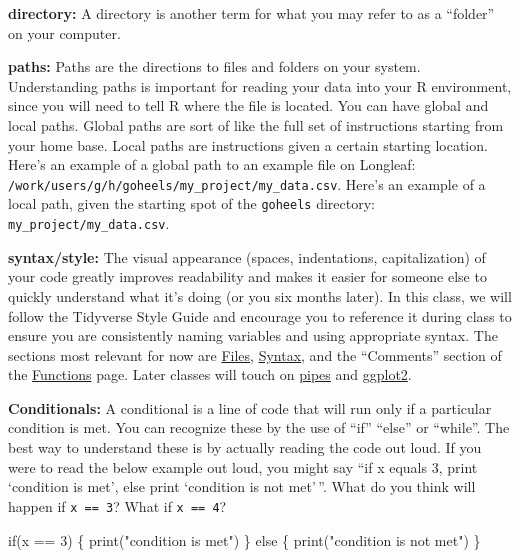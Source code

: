 \documentclass[
  letterpaper,
  DIV=11,
  numbers=noendperiod]{scrreprt}
\newenvironment{Shaded}{\begin{snugshade}}{\end{snugshade}}
\newcommand{\ControlFlowTok}[1]{\textcolor[rgb]{0.00,0.23,0.31}{#1}}
\newcommand{\DecValTok}[1]{\textcolor[rgb]{0.68,0.00,0.00}{#1}}
\newcommand{\FunctionTok}[1]{\textcolor[rgb]{0.28,0.35,0.67}{#1}}
\newcommand{\NormalTok}[1]{\textcolor[rgb]{0.00,0.23,0.31}{#1}}
\newcommand{\SpecialCharTok}[1]{\textcolor[rgb]{0.37,0.37,0.37}{#1}}
\newcommand{\StringTok}[1]{\textcolor[rgb]{0.13,0.47,0.30}{#1}}
\begin{document}
\textbf{directory:} A directory is another term for what you may refer
to as a ``folder'' on your computer.

\textbf{paths:} Paths are the directions to files and folders on your
system. Understanding paths is important for reading your data into your
R environment, since you will need to tell R where the file is located.
You can have global and local paths. Global paths are sort of like the
full set of instructions starting from your home base. Local paths are
instructions given a certain starting location. Here's an example of a
global path to an example file on Longleaf:
\texttt{/work/users/g/h/goheels/my\_project/my\_data.csv}. Here's an
example of a local path, given the starting spot of the \texttt{goheels}
directory: \texttt{my\_project/my\_data.csv}.

\textbf{syntax/style:} The visual appearance (spaces, indentations,
capitalization) of your code greatly improves readability and makes it
easier for someone else to quickly understand what it's doing (or you
six months later). In this class, we will follow the Tidyverse Style
Guide and encourage you to reference it during class to ensure you are
consistently naming variables and using appropriate syntax. The sections
most relevant for now are
\href{https://style.tidyverse.org/files.html}{Files},
\href{https://style.tidyverse.org/files.html}{Syntax}, and the
``Comments'' section of the
\href{https://style.tidyverse.org/functions.html\#comments-1}{Functions}
page. Later classes will touch on
\href{https://style.tidyverse.org/pipes.html}{pipes} and
\href{https://style.tidyverse.org/ggplot2.html}{ggplot2}.

\textbf{Conditionals:} A conditional is a line of code that will run
only if a particular condition is met. You can recognize these by the
use of ``if'' ``else'' or ``while''. The best way to understand these is
by actually reading the code out loud. If you were to read the below
example out loud, you might say ``if x equals 3, print `condition is
met', else print `condition is not met'\,''. What do you think will
happen if \texttt{x\ ==\ 3}? What if \texttt{x\ ==\ 4}?

\begin{Shaded}
\begin{Highlighting}[]
\ControlFlowTok{if}\NormalTok{(x }\SpecialCharTok{==} \DecValTok{3}\NormalTok{) \{}
  \FunctionTok{print}\NormalTok{(}\StringTok{"condition is met"}\NormalTok{)}
\NormalTok{\} }\ControlFlowTok{else}\NormalTok{ \{}
  \FunctionTok{print}\NormalTok{(}\StringTok{"condition is not met"}\NormalTok{)}
\NormalTok{\}}
\end{Highlighting}
\end{Shaded}
\end{document}
